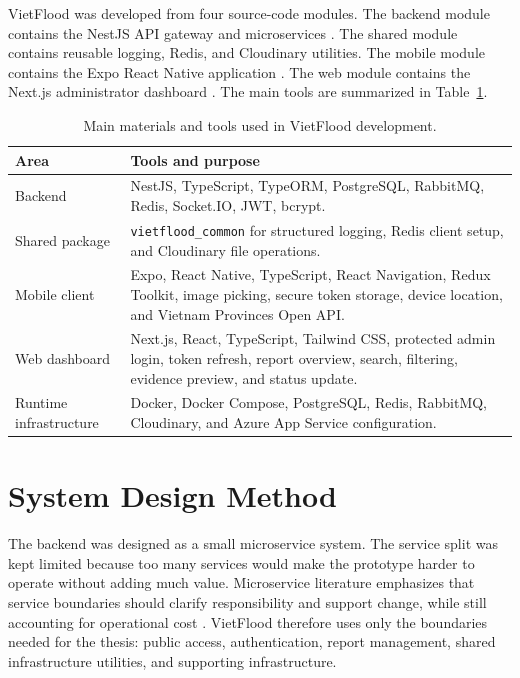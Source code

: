 VietFlood was developed from four source-code modules. The backend module contains the NestJS API gateway and microservices \cite{nestjsDocs,nestjsMicroservicesDocs}. The shared module contains reusable logging, Redis, and Cloudinary utilities. The mobile module contains the Expo React Native application \cite{expoDocs,reactNativeDocs}. The web module contains the Next.js administrator dashboard \cite{nextjsDocs}. The main tools are summarized in Table~\ref{tab:method-tools}.

\begin{table}[htbp]
\centering
\caption{Main materials and tools used in VietFlood development.}
\label{tab:method-tools}
\begin{tabular}{|>{\raggedright\arraybackslash}p{4cm}|>{\raggedright\arraybackslash}p{9cm}|}
\hline
\textbf{Area} & \textbf{Tools and purpose} \\
\hline
Backend & NestJS, TypeScript, TypeORM, PostgreSQL, RabbitMQ, Redis, Socket.IO, JWT, bcrypt. \\
\hline
Shared package & \texttt{vietflood\_common} for structured logging, Redis client setup, and Cloudinary file operations. \\
\hline
Mobile client & Expo, React Native, TypeScript, React Navigation, Redux Toolkit, image picking, secure token storage, device location, and Vietnam Provinces Open API. \\
\hline
Web dashboard & Next.js, React, TypeScript, Tailwind CSS, protected admin login, token refresh, report overview, search, filtering, evidence preview, and status update. \\
\hline
Runtime infrastructure & Docker, Docker Compose, PostgreSQL, Redis, RabbitMQ, Cloudinary, and Azure App Service configuration. \\
\hline
\end{tabular}
\end{table}

\section{System Design Method}

The backend was designed as a small microservice system. The service split was kept limited because too many services would make the prototype harder to operate without adding much value. Microservice literature emphasizes that service boundaries should clarify responsibility and support change, while still accounting for operational cost \cite{fowlerLewis2014microservices,dragoni2017microservices,thones2015microservices}. VietFlood therefore uses only the boundaries needed for the thesis: public access, authentication, report management, shared infrastructure utilities, and supporting infrastructure.


